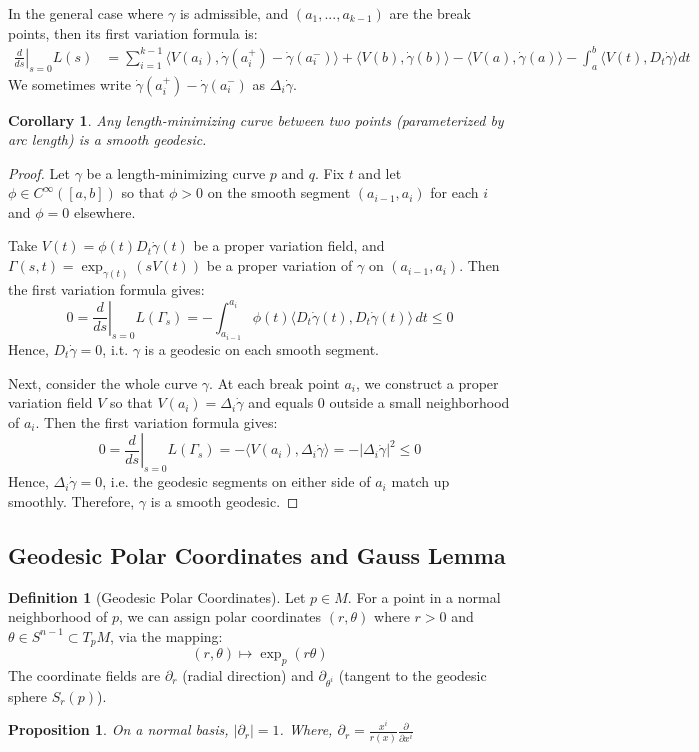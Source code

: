 \documentclass[11pt, a4paper]{article}
\theoremstyle{plain}
\newtheorem{proposition}[theorem]{Proposition}
\newtheorem{corollary}[theorem]{Corollary}
\theoremstyle{definition}
\newtheorem{definition}[theorem]{Definition}
\theoremstyle{remark}
\newcommand{\p}{\partial}
\begin{document}
{In the general case where $\gamma$ is admissible, and $(a_1,...,a_{k-1})$ are the break points, then its first variation formula is:
\begin{align*}
\left. \frac{d}{ds} \right|_{s=0} L(s) &= \sum_{i=1}^{k-1} \langle V(a_i), \dot{\gamma}(a_i^+) - \dot{\gamma}(a_i^-) \rangle + \langle V(b), \dot{\gamma}(b) \rangle - \langle V(a), \dot{\gamma}(a) \rangle - \int_a^b \langle V(t), D_t \dot{\gamma} \rangle dt
\end{align*}
We sometimes write $\dot{\gamma}(a_i^+) - \dot{\gamma}(a_i^-)$ as $\Delta_i \dot\gamma$. 

\begin{corollary}
Any length-minimizing curve between two points (parameterized by arc length) is a smooth geodesic.
\end{corollary}

\begin{proof}
Let $\gamma$ be a length-minimizing curve $p$ and $q$. Fix $t$ and let $\phi\in C^\infty([a,b])$ so that $\phi>0$ on the smooth
segment $(a_{i-1}, a_i)$ for each $i$ and $\phi = 0$ elsewhere.

Take $V(t)=\phi(t)D_t \dot{\gamma}(t)$ be a proper variation field, and $\Gamma(s,t) = \exp_{\gamma(t)}(s V(t))$ be a proper variation of $\gamma$ on $(a_{i-1}, a_i)$.
Then the first variation formula gives:
\[0 = \left. \frac{d}{ds} \right|_{s=0} L(\Gamma_s) = -\int_{a_{i-1}}^{a_i} \phi(t) \langle D_t \dot{\gamma}(t), D_t \dot{\gamma}(t) \rangle \, dt \le 0\]
Hence, $D_t\dot\gamma = 0$, i.t. $\gamma$ is a geodesic on each smooth segment.

Next, consider the whole curve $\gamma$. At each break point $a_i$, we construct a proper variation field $V$ so that 
$V(a_i) = \Delta_i\dot\gamma$ and equals $0$ outside a small neighborhood of $a_i$. Then the first variation formula gives:
\[0 = \left. \frac{d}{ds} \right|_{s=0} L(\Gamma_s) = -\langle V(a_i), \Delta_i\dot\gamma \rangle = -|\Delta_i\dot\gamma|^2 \le 0\]
Hence, $\Delta_i\dot\gamma = 0$, i.e. the geodesic segments on either side of $a_i$ match up smoothly. Therefore, $\gamma$ is a smooth geodesic.

\end{proof}

\subsection{Geodesic Polar Coordinates and Gauss Lemma}

\begin{definition}[Geodesic Polar Coordinates]
Let $p \in M$. For a point in a normal neighborhood of $p$, we can assign polar coordinates $(r, \theta)$ where $r > 0$ and $\theta \in S^{n-1} \subset T_p M$, via the mapping:
\[ (r, \theta) \mapsto \exp_p(r \theta) \]
The coordinate fields are $\partial_r$ (radial direction) and $\partial_{\theta^i}$ (tangent to the geodesic sphere $S_r(p)$).
\end{definition}
\begin{proposition}
    On a normal basis, $|\p_r| = 1$. Where, $\p_r = \frac{x^i}{r(x)}\frac{\p}{\p x^i}$
\end{proposition}

}
\end{document}
